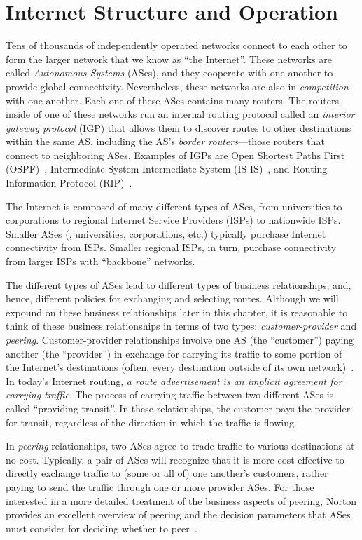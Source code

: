 \section{Internet Structure and Operation}\label{sec:structure}

Tens of thousands of independently operated networks connect to each
other to form the larger network that we know as ``the Internet''.
These networks are called {\em Autonomous Systems} (ASes), and they
cooperate with one another to provide global connectivity.
Nevertheless, these networks are also in {\em competition} with one
another.  Each one of these ASes contains many routers.  The routers
inside of one of these networks run an internal routing protocol called
an {\em interior gateway protocol} (IGP) that allows them to discover
routes to other destinations within the same AS, including the AS's {\em
border routers}---those routers that connect to neighboring ASes.
Examples of IGPs are Open Shortest Paths First (OSPF)~\cite{rfc1583},
Intermediate System-Intermediate System (IS-IS)~\cite{rfc1142}, and
Routing Information Protocol (RIP)~\cite{rfc1058}.

The Internet is composed of many different types of ASes, from
universities to corporations to regional Internet Service Providers
(ISPs) to nationwide ISPs.  Smaller ASes (\eg, universities,
corporations, etc.) typically purchase Internet connectivity from ISPs.
Smaller regional ISPs, in turn, purchase connectivity from larger
ISPs with ``backbone'' networks.  

The different types of ASes lead to different types of business
relationships, and, hence, different policies for exchanging and
selecting routes.  Although we will expound on these business
relationships later in this chapter, it is reasonable to think of these
business relationships in terms of two types: {\em customer-provider}
and {\em peering}.  Customer-provider relationships involve one AS (the
``customer'') paying another (the ``provider'') in exchange for carrying
its traffic to some portion of the Internet's destinations (often, every
destination outside of its own network)~\cite{Gao2001}.  In today's
Internet routing, 
{\em a route advertisement is an implicit agreement for carrying
traffic}.  The process of carrying traffic between two different ASes is
called ``providing transit''.  In these relationships, the customer pays
the provider for transit, regardless of the direction in which the
traffic is flowing.

In {\em peering} relationships, two ASes agree to trade traffic to
various destinations at no cost.  Typically, a pair of ASes will
recognize that it is more cost-effective to directly exchange traffic to
(some or all of) one another's customers, rather paying to send the
traffic through one or more provider ASes.  For those interested in a
more detailed treatment of the business aspects of peering, Norton
provides an excellent overview of peering and the decision parameters
that ASes must consider for deciding whether to peer~\cite{Norton2000}.


